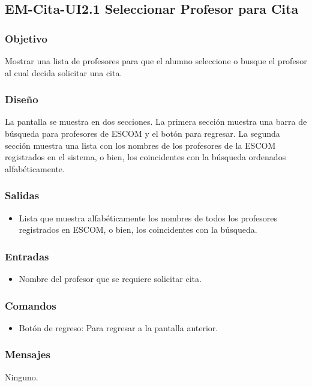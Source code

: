 \subsection{EM-Cita-UI2.1 Seleccionar Profesor para Cita }

\subsubsection{Objetivo}
	\noindent
	Mostrar una lista de profesores para que el alumno seleccione o busque el profesor al cual decida solicitar una cita.

\subsubsection{Diseño}
	\noindent
	La pantalla se muestra en dos secciones. La primera sección muestra una barra de búsqueda para profesores de ESCOM y el botón para regresar. La segunda sección muestra una lista con los nombres de los profesores de la ESCOM registrados en el sistema, o bien, los coincidentes con la búsqueda ordenados alfabéticamente. 


\subsubsection{Salidas}
	\begin{itemize}
		\item Lista que muestra alfabéticamente los nombres de todos los profesores registrados en ESCOM, o bien, los coincidentes con la búsqueda. 
	\end{itemize}

\subsubsection{Entradas}

\begin{itemize}
		\item Nombre del profesor que se requiere solicitar cita.  
	\end{itemize}

\subsubsection{Comandos}
\begin{itemize}
		\item Botón de regreso: Para regresar a la pantalla anterior. 
	\end{itemize}

\subsubsection{Mensajes}
Ninguno.

